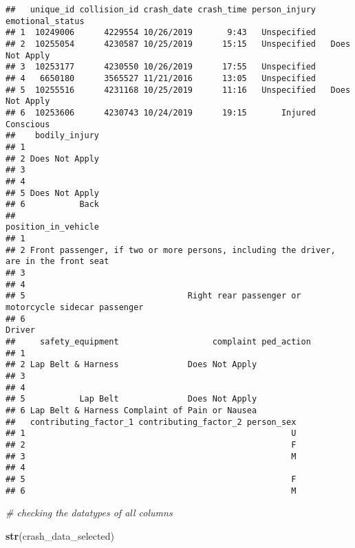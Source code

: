 \documentclass[
]{article}
\newenvironment{Shaded}{\begin{snugshade}}{\end{snugshade}}
\newcommand{\CommentTok}[1]{\textcolor[rgb]{0.56,0.35,0.01}{\textit{#1}}}
\newcommand{\FunctionTok}[1]{\textcolor[rgb]{0.13,0.29,0.53}{\textbf{#1}}}
\newcommand{\NormalTok}[1]{#1}
\begin{document}
\begin{verbatim}
##   unique_id collision_id crash_date crash_time person_injury emotional_status
## 1  10249006      4229554 10/26/2019       9:43   Unspecified                 
## 2  10255054      4230587 10/25/2019      15:15   Unspecified   Does Not Apply
## 3  10253177      4230550 10/26/2019      17:55   Unspecified                 
## 4   6650180      3565527 11/21/2016      13:05   Unspecified                 
## 5  10255516      4231168 10/25/2019      11:16   Unspecified   Does Not Apply
## 6  10253606      4230743 10/24/2019      19:15       Injured        Conscious
##    bodily_injury
## 1               
## 2 Does Not Apply
## 3               
## 4               
## 5 Does Not Apply
## 6           Back
##                                                                    position_in_vehicle
## 1                                                                                     
## 2 Front passenger, if two or more persons, including the driver, are in the front seat
## 3                                                                                     
## 4                                                                                     
## 5                                 Right rear passenger or motorcycle sidecar passenger
## 6                                                                               Driver
##     safety_equipment                   complaint ped_action
## 1                                                          
## 2 Lap Belt & Harness              Does Not Apply           
## 3                                                          
## 4                                                          
## 5           Lap Belt              Does Not Apply           
## 6 Lap Belt & Harness Complaint of Pain or Nausea           
##   contributing_factor_1 contributing_factor_2 person_sex
## 1                                                      U
## 2                                                      F
## 3                                                      M
## 4                                                       
## 5                                                      F
## 6                                                      M
\end{verbatim}

\begin{Shaded}
\begin{Highlighting}[]
\CommentTok{\# checking the datatypes of all columns}

\FunctionTok{str}\NormalTok{(crash\_data\_selected)}
\end{Highlighting}
\end{Shaded}
\end{document}
